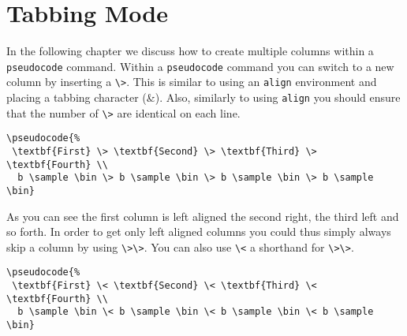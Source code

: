 \documentclass[a4paper]{report}
\begin{document}
\chapter{Tabbing Mode}
\label{chap:tabbing}
\index{\&}
In the following chapter we discuss how to create multiple columns within a \lstinline$pseudocode$ command.
Within a \lstinline$pseudocode$ command you can switch to a new column by inserting a \lstinline$\>$. 
This is similar to using an \lstinline$align$ environment and placing a tabbing character (\&). Also,
similarly to using \lstinline$align$ you should ensure that the number of \lstinline$\>$ are identical
on each line.
\begin{center}
\end{center}
\begin{lstlisting}
\pseudocode{%
 \textbf{First} \> \textbf{Second} \> \textbf{Third} \> \textbf{Fourth} \\
  b \sample \bin \> b \sample \bin \> b \sample \bin \> b \sample \bin}
\end{lstlisting}
As you can see the first column is left aligned the second right, the third left and so forth.
In order to get only left aligned columns you could thus simply always skip a column by
using \lstinline$\>\>$. You can also use \lstinline$\<$ a shorthand for \lstinline$\>\>$.
\begin{center}
\end{center}
\begin{lstlisting}
\pseudocode{%
 \textbf{First} \< \textbf{Second} \< \textbf{Third} \< \textbf{Fourth} \\
  b \sample \bin \< b \sample \bin \< b \sample \bin \< b \sample \bin}
\end{lstlisting}
\end{document}
